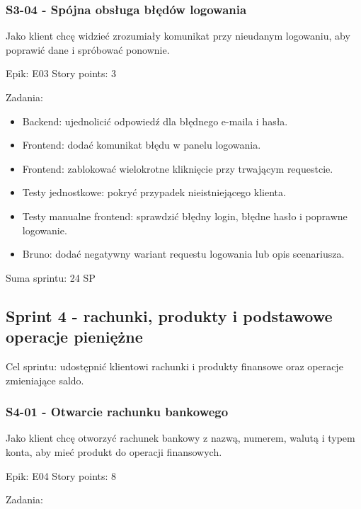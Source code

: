 \documentclass[12pt,a4paper]{article}
\begin{document}
\subsubsection*{S3-04 - Spójna obsługa błędów logowania}

Jako klient chcę widzieć zrozumiały komunikat przy nieudanym logowaniu, aby poprawić dane i spróbować ponownie.

Epik: E03
Story points: 3

Zadania:

\begin{itemize}
\item Backend: ujednolicić odpowiedź dla błędnego e-maila i hasła.
\item Frontend: dodać komunikat błędu w panelu logowania.
\item Frontend: zablokować wielokrotne kliknięcie przy trwającym requestcie.
\item Testy jednostkowe: pokryć przypadek nieistniejącego klienta.
\item Testy manualne frontend: sprawdzić błędny login, błędne hasło i poprawne logowanie.
\item Bruno: dodać negatywny wariant requestu logowania lub opis scenariusza.
\end{itemize}

Suma sprintu: 24 SP

\subsection*{Sprint 4 - rachunki, produkty i podstawowe operacje pieniężne}

Cel sprintu: udostępnić klientowi rachunki i produkty finansowe oraz operacje zmieniające saldo.

\subsubsection*{S4-01 - Otwarcie rachunku bankowego}

Jako klient chcę otworzyć rachunek bankowy z nazwą, numerem, walutą i typem konta, aby mieć produkt do operacji finansowych.

Epik: E04
Story points: 8

Zadania:
\end{document}
